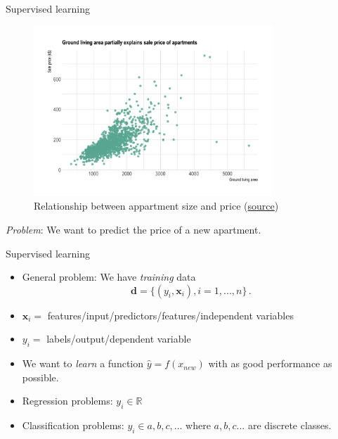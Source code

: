 \documentclass[10pt,handout]{beamer}
\begin{document}
\begin{frame}{Supervised learning}

\begin{figure}[h]
\caption{Relationship between appartment size and price (\href{https://www.data-to-viz.com/story/TwoNum.html}{source})}
\centering
\includegraphics[width=0.8\textwidth]{figs/scatter_apartment.png}
\end{figure}

\emph{Problem}: We want to predict the price of a new apartment.

\end{frame}



\begin{frame}{Supervised learning}

\begin{itemize}
\item General problem: We have \emph{training} data
\[
\mathbf{d} = \{(y_i, \mathbf{x}_i), i = 1, ..., n\} \,.
\]
\item $\mathbf{x}_i = $ features/input/predictors/features/independent variables
\item $y_i = $ labels/output/dependent variable
\item We want to \emph{learn} a function $\hat{y} = f(x_{new})$ with as good performance as possible.\pause
\item Regression problems: $y_i \in \mathbb{R}$
\item Classification problems: $y_i \in {a,b,c,...}$ where $a,b,c ...$ are discrete classes.
\end{itemize}

\end{frame}
\end{document}
